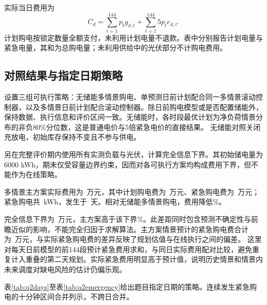 实际当日费用为
\begin{equation}C_d=\sum_{t=1}^{144}p_tg_{d,t}+\sum_{t=1}^{144}5p_te_{d,t}.
\end{equation}
计划购电按锁定数量全额支付，未利用计划电量不退款。表中分别报告计划电量与紧急电量，其和为总购电量；未利用供给中的光伏部分不计购电费用。

\subsection{对照结果与指定日期策略}
设置三组可执行策略：无储能多情景购电、单预测日前计划配合同一多情景滚动控制器，以及多情景日前计划配合滚动控制器。除日前购电模型或是否配置储能外，保持数据、执行信息和评价区间一致。无储能时，各时段最优计划为净负荷情景分布的非负80\%分位数，这是普通电价与5倍紧急电价的直接结果。
无储能对照关闭充放电，初始库存保持不变且不参与供电。

另在完整评价期内使用所有实测负载与光伏，计算完全信息下界。其初始储电量为6000 kWh，期末仅受容量边界约束，因而对各可执行方案均构成费用下界，但不能作为在线策略。

\begin{table}[htbp]\centering\scriptsize
\caption{评价期策略比较}\label{tab:q2compare}
\resizebox{\textwidth}{!}{}
\end{table}
多情景主方案实际费用为\QtwoCost\ 万元，其中计划购电费为\QtwoPlanCost\ 万元、紧急购电费为\QtwoEmergencyCost\ 万元；紧急购电共\QtwoEmergency\ kWh，发生于\QtwoDays\ 天。相对无储能多情景购电，费用降低\QtwoNoStorageSaving\%。


完全信息下界为\QtwoLower\ 万元，主方案高于该下界\QtwoGap\%。此差距同时包含预测不确定性与前瞻近似的影响，不能完全归因于求解算法。主方案情景预计的紧急购电费合计为\QtwoExpectedEmergency\ 万元，与实际紧急购电费的差异反映了规划估值与在线执行之间的偏差。
这里对每天日前模型的前144段预计紧急费用求和，与同日实际费用配对比较，避免重复计入重叠的第二天规划。实际紧急费用明显高于预计值，说明历史情景和情景内未来调度对缺电风险的估计仍偏乐观。

\begin{table}[htbp]\centering\scriptsize
\caption{指定日期的费用、电量与首尾储电量（费用单位：元；电量单位：kWh）}\label{tab:q2days}
\resizebox{\textwidth}{!}{}
\end{table}
\begin{table}[htbp]\centering\small
\caption{指定时段的计划购电量（kWh）}\label{tab:q2purchase}

\end{table}
\begin{table}[htbp]\centering\scriptsize
\caption{指定日期各四小时时段的充放电量（kWh）}\label{tab:q2storage}
\resizebox{\textwidth}{!}{}
\end{table}
\begin{table}[htbp]\centering\small
\caption{指定日期的紧急购电区间及电量}\label{tab:q2emergency}

\end{table}
表\ref{tab:q2days}至表\ref{tab:q2emergency}给出题目指定日期的策略。连续发生紧急购电的十分钟区间合并列示，不跨日合并。


